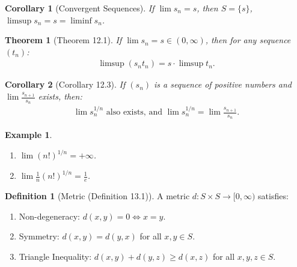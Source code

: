 \documentclass[7pt]{article}
\theoremstyle{definition}
\newtheorem{definition}{Definition}
\theoremstyle{plain}
\newtheorem{theorem}{Theorem}
\newtheorem{example}{Example}
\newtheorem{corollary}{Corollary}
\begin{document}

\begin{corollary}[Convergent Sequences]
If $ \lim s_n = s $, then $ S = \{s\} $, $ \limsup s_n = s = \liminf s_n $.
\end{corollary}

\begin{theorem}[Theorem 12.1]
If $ \lim s_n = s \in (0, \infty) $, then for any sequence $ (t_n) $:
\begin{align}
\limsup (s_n t_n) = s \cdot \limsup t_n.
\end{align}
\end{theorem}

\begin{corollary}[Corollary 12.3]
If $ (s_n) $ is a sequence of positive numbers and $ \lim \frac{s_{n+1}}{s_n} $ exists, then:
\begin{align}
\lim s_n^{1/n} \text{ also exists, and } \lim s_n^{1/n} = \lim \frac{s_{n+1}}{s_n}.
\end{align}
\end{corollary}

\begin{example}

\begin{enumerate}
    \item $ \lim (n!)^{1/n} = +\infty $.
    \item $ \lim \frac{1}{n} (n!)^{1/n} = \frac{1}{e} $.
\end{enumerate}
\end{example}

\begin{definition}[Metric (Definition 13.1)]
A metric $ d : S \times S \to [0, \infty) $ satisfies:
\begin{enumerate}[label=(D\arabic*)]
    \item {Non-degeneracy:} $ d(x, y) = 0 \iff x = y $.
    \item {Symmetry:} $ d(x, y) = d(y, x) $ for all $ x, y \in S $.
    \item {Triangle Inequality:} $ d(x, y) + d(y, z) \geq d(x, z) $ for all $ x, y, z \in S $.
\end{enumerate}
\end{definition}
\end{document}
